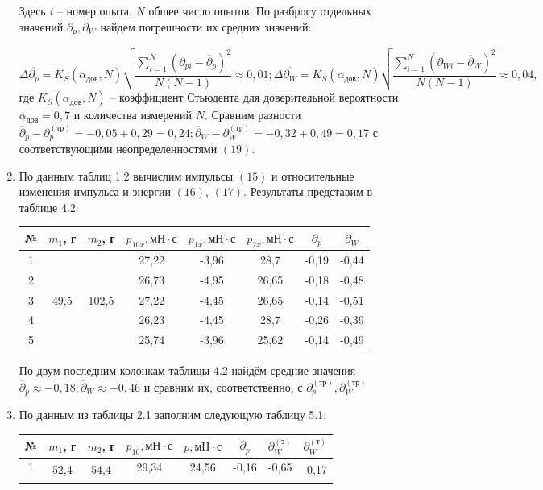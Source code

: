 \documentclass[12pt]{article}
\begin{document}
\begin{enumerate}
Здесь $i$ – номер опыта, $N$ общее число опытов. По разбросу отдельных значений
$\partial_{p},\partial_{W}$ найдем погрешности их средних значений:

\begin{equation}
\Delta \overline{\partial_{p}} = K_{S}(\alpha_{дов}, N) \sqrt{ \frac{\sum_{i=1}^N(\partial_{pi}-\overline{\partial}_{p})^2}{N(N-1)}} \approx 0,01;
\Delta \overline{\partial_{W}} = K_{S}(\alpha_{дов}, N) \sqrt{ \frac{\sum_{i=1}^N(\partial_{Wi}-\overline{\partial}_{W})^2}{N(N-1)}} \approx 0,04,
\end{equation}
где $K_{S}(\alpha_{дов}, N)$ – коэффициент Стьюдента для доверительной вероятности
$\alpha_{дов}= 0,7$ и количества измерений $N$. Сравним разности $\overline{\partial}_{p} -\partial^{(тр)}_{p} = -0,05 + 0,29 = 0,24; \overline{\partial}_{W} -\partial^{(тр)}_{W}= -0,32 + 0,49 = 0,17$
с соответствующими неопределенностями $(19)$.
\item По данным таблиц 1.2 вычислим импульсы $(15)$ и относительные
изменения импульса и энергии $(16)$, $(17)$. Результаты представим в таблице
4.2:
\begin{table}[h!]
\begin{center}
\begin{tabular}{|c|c|c|c|c|c|c|c|}
\hline
 № & $m_{1}$, г & $m_{2}$, г  & $p_{10x}, мН\cdot с$ &$p_{1x}, мН\cdot с$ &$p_{2x}, мН\cdot с$ & $\partial_{p}$& $\partial_{W}$\\
\hline
 1 &\multirow{5}{*}{49,5}& \multirow{5}{*}{102,5}& 27,22&	-3,96&	28,7&	-0,19	&-0,44\\
\hhline{-~~-----}

 2 &    &  & 	26,73&	-4,95	&26,65	&-0,18	&-0,48\\
\hhline{-~~-----}
 3 &   &  &27,22&	-4,45	&26,65&	-0,14	&-0,51 \\
\hhline{-~~-----}
 4 &  &  &26,23	&-4,45	&28,7	&-0,26&	-0,39 \\
\hhline{-~~-----}
 5 &    &  &25,74&	-3,96&	25,62&	-0,14&	-0,49 \\
\hline
\end{tabular}
\end{center}
\end{table}               

По двум последним колонкам таблицы 4.2
найдём средние значения $\overline{\partial}_{p}\approx-0,18; \overline{\partial}_{W}\approx-0,46$ и сравним их, соответственно, с $\partial^{(тр)}_{p}, \partial^{(тр)}_{W}$
\newpage
\item По данным из таблицы 2.1 заполним следующую таблицу 5.1:
\begin{table}[h!]
\begin{center}
\begin{tabular}{|c|c|c|c|c|c|c|c|}
\hline
 № & $m_{1}$, г & $m_{2}$, г  & $p_{10}, мН\cdot с$ &$p, мН\cdot с$ &$\partial_{p}$&$\partial^{(э)}_{W}$& $\partial^{(т)}_{W}$\\
\hline
 1 &\multirow{5}{*}{52,4}& \multirow{5}{*}{54,4}& 29,34&	24,56&	-0,16&	-0,65& \multirow{5}{*}{-0,17}\\
\hhline{-~~----~}


\end{tabular}
\end{center}
\end{table}
\end{enumerate}
\end{document}
